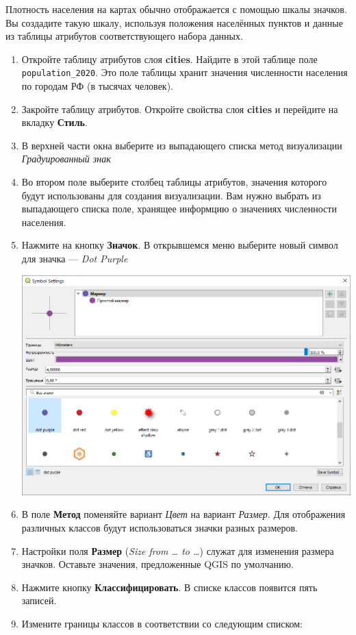 \documentclass[
  12pt,
]{book}
\begin{document}
Плотность населения на картах обычно отображается с помощью шкалы значков. Вы создадите такую шкалу, используя положения населённых пунктов и данные из таблицы атрибутов соответствующего набора данных.

\begin{enumerate}
\def\labelenumi{\arabic{enumi}.}
\item
  Откройте таблицу атрибутов слоя \textbf{cities}. Найдите в этой таблице поле \texttt{population\_2020}. Это поле таблицы хранит значения численности населения по городам РФ (в тысячах человек).
\item
  Закройте таблицу атрибутов. Откройте свойства слоя \textbf{cities} и перейдите на вкладку \textbf{Стиль}.
\item
  В верхней части окна выберите из выпадающего списка метод визуализации \emph{Градуированный знак}
\item
  Во втором поле выберите столбец таблицы атрибутов, значения которого будут использованы для создания визуализации. Вам нужно выбрать из выпадающего списка поле, хранящее информцию о значениях численности населения.
\item
  Нажмите на кнопку \textbf{Значок}. В открывшемся меню выберите новый символ для значка --- \emph{Dot Purple}

  \includegraphics{images/Ex03/dot_purple.png}
\item
  В поле \textbf{Метод} поменяйте вариант \emph{Цвет} на вариант \emph{Размер}. Для отображения различных классов будут использоваться значки разных размеров.
\item
  Настройки поля \textbf{Размер} (\emph{Size from \ldots{} to \ldots{}}) служат для изменения размера значков. Оставьте значения, предложенные QGIS по умолчанию.
\item
  Нажмите кнопку \textbf{Классифицировать}. В списке классов появится пять записей.
\item
  Измените границы классов в соответствии со следующим списком:


\end{enumerate}
\end{document}
